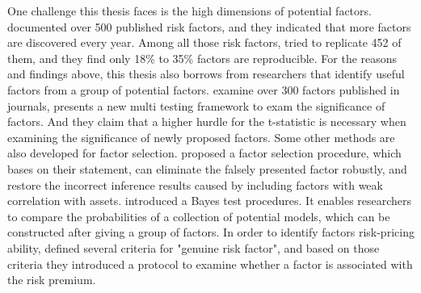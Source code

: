 One challenge this thesis faces is the high dimensions of potential factors.
 documented over 500 published risk factors, and they indicated that more factors are discovered every year.
Among all those risk factors,  tried to replicate 452 of them, and they find only 18\% to 35\% factors are reproducible.
For the reasons and findings above, this thesis also borrows from researchers that identify useful factors from a group of potential factors.
 examine over 300 factors published in journals, presents a new multi testing framework to exam the significance of factors.
And they claim that a higher hurdle for the t-statistic is necessary when examining the significance of newly proposed factors.
Some other methods are also developed for factor selection.
 proposed a factor selection procedure, which bases on their statement, can eliminate the falsely presented factor robustly, and restore the incorrect inference results caused by including factors with weak correlation with assets.
 introduced a Bayes test procedures.
It enables researchers to compare the probabilities of a collection of potential models, which can be constructed after giving a group of factors.
In order to identify factors risk-pricing ability,  defined several criteria for "genuine risk factor", and based on those criteria they introduced a protocol to examine whether a factor is associated with the risk premium.

